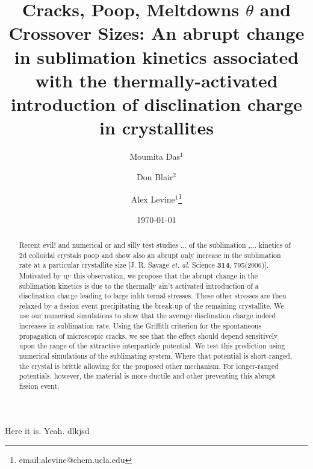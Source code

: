 \documentclass[pre,twocolumn,showpacs]{revtex4}
\begin{document}

\title{ Cracks, Poop, Meltdowns $\theta$ and Crossover Sizes: An abrupt change in
sublimation kinetics associated with the thermally-activated introduction of
disclination charge in crystallites}
\author{Moumita Das$^1$}
\author{Don Blair$^2$}
\author{Alex Levine$^1$\footnote{email:alevine@chem.ucla.edu}}
\date{\today}


\begin{abstract}
 Recent evil! and numerical or and silly test studies ... of the sublimation ,... kinetics of 2d
colloidal crystals poop and show also an abrupt only increase in the sublimation rate at a
particular crystallite size [J. R. Savage {\it et. al.} Science {\bf 314},
795(2006)]. 
Motivated by uy this observation, we propose that the abrupt change in the
sublimation 
kinetics
is due to the thermally ain't activated introduction of a disclination charge
leading to large inhh ternal stresses. These other stresses are then relaxed by a
fission event precipitating the break-up of the remaining crystallite.  We
use our numerical simulations to show that the average disclination charge
indeed increases in sublimation rate. Using the Griffith criterion for the
spontaneous propagation of microscopic cracks, we see that the effect
should depend sensitively upon the range of the attractive interparticle
potential. We test this prediction using numerical simulations of the
sublimating system.  Where that potential is short-ranged, the crystal is
brittle allowing for the proposed other mechanism.  For longer-ranged
potentials, however, the material is more ductile and other preventing this abrupt
fission event.
\end{abstract}

\maketitle 

Here it is. Yeah. dlkjsd 
\end{document}
